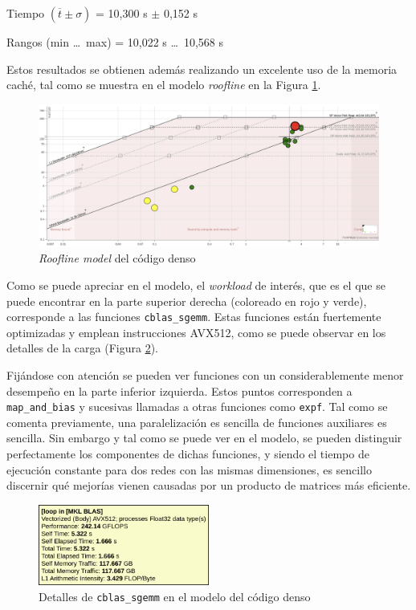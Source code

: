 \begin{center}
Tiempo $(\overline{t} \pm \sigma)$ = 10,300 s $\pm$ 0,152 s

Rangos (min \ldots\ max) = 10,022 s \ldots\ 10,568 s
\end{center}

Estos resultados se obtienen además realizando un excelente uso de la memoria caché, tal como se muestra en el modelo \textit{roofline} en la Figura \ref{fig:roofline_dense}.

\begin{figure}[h!]
    \centering
    \includegraphics[width=\textwidth]{img/roofline_dense.png}
    \caption{\textit{Roofline model} del código denso}
    \label{fig:roofline_dense}
\end{figure}

Como se puede apreciar en el modelo, el \textit{workload} de interés, que es el que se puede encontrar en la parte superior derecha (coloreado en rojo y verde), corresponde a las funciones \texttt{cblas\_sgemm}. Estas funciones están fuertemente optimizadas y emplean instrucciones AVX512, como se puede observar en los detalles de la carga (Figura \ref{fig:roofline_dense_details}).

Fijándose con atención se pueden ver funciones con un considerablemente menor desempeño en la parte inferior izquierda. Estos puntos corresponden a \texttt{map\_and\_bias} y sucesivas llamadas a otras funciones como \texttt{expf}. Tal como se comenta previamente, una paralelización es sencilla de funciones auxiliares es sencilla. Sin embargo y tal como se puede ver en el modelo, se pueden distinguir perfectamente los componentes de dichas funciones, y siendo el tiempo de ejecución constante para dos redes con las mismas dimensiones, es sencillo discernir qué mejorías vienen causadas por un producto de matrices más eficiente.    

\begin{figure}[h!]
    \centering
    \includegraphics[width=0.5\textwidth]{img/roofline_dense_details.png}
    \caption{Detalles de \texttt{cblas\_sgemm} en el modelo del código denso}
    \label{fig:roofline_dense_details}
\end{figure}

